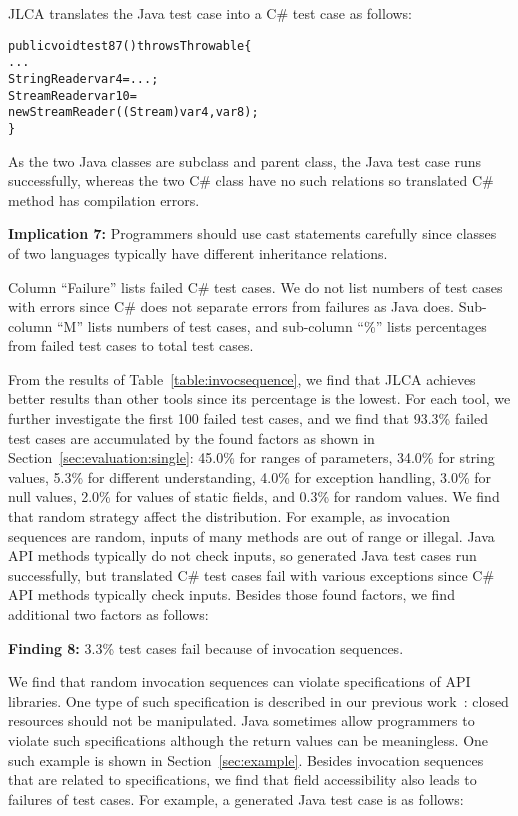 JLCA translates the Java test case into a C\# test case as follows:

\begin{CodeOut}%
\begin{alltt}
public void test87() throws Throwable\{
  ...
  StringReader var4=...;
  StreamReader var10=
    new StreamReader((Stream)var4, var8);
\}
\end{alltt}
\end{CodeOut}

As the two Java classes are subclass and parent class, the Java test case runs successfully, whereas the two C\# class have no such relations so translated C\# method has compilation errors.

\textbf{Implication 7:} Programmers should use cast statements carefully since classes of two languages typically have different inheritance relations.

Column ``Failure'' lists failed C\# test cases. We do not list numbers of test cases with errors since C\# does not separate errors from failures as Java does. Sub-column ``M'' lists numbers of test cases, and sub-column ``\%'' lists percentages from failed test cases to total test cases.

From the results of Table~\ref{table:invocsequence}, we find that JLCA achieves better results than other tools since its percentage is the lowest. For each tool, we further investigate the first 100 failed test cases, and we find that 93.3\% failed test cases are accumulated by the found factors as shown in Section~\ref{sec:evaluation:single}: 45.0\% for ranges of parameters, 34.0\% for string values, 5.3\% for different understanding, 4.0\% for exception handling, 3.0\% for null values, 2.0\% for values of static fields, and 0.3\% for random values. We find that random strategy affect the distribution. For example, as invocation sequences are random, inputs of many methods are out of range or illegal. Java API methods typically do not check inputs, so generated Java test cases run successfully, but translated C\# test cases fail with various exceptions since C\# API methods typically check inputs. Besides those found factors, we find additional two factors as follows:

\textbf{Finding 8:} 3.3\% test cases fail because of invocation sequences.

We find that random invocation sequences can violate specifications of API libraries. One type of such specification is described in our previous work~\cite{zhong09:inferring}: closed resources should not be manipulated. Java sometimes allow programmers to violate such specifications although the return values can be meaningless. One such example is shown in Section~\ref{sec:example}. Besides invocation sequences that are related to specifications, we find that field accessibility also leads to failures of test cases. For example, a generated Java test case is as follows:

